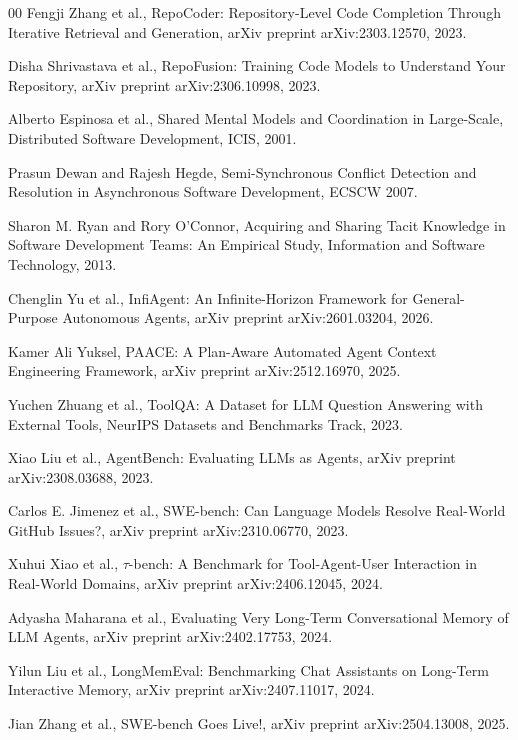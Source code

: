 \documentclass[a4paper,fleqn]{cas-dc}
\begin{document}
\begin{thebibliography}{00}
Fengji Zhang et al., RepoCoder: Repository-Level Code Completion Through Iterative Retrieval and Generation, arXiv preprint arXiv:2303.12570, 2023.

Disha Shrivastava et al., RepoFusion: Training Code Models to Understand Your Repository, arXiv preprint arXiv:2306.10998, 2023.

Alberto Espinosa et al., Shared Mental Models and Coordination in Large-Scale, Distributed Software Development, ICIS, 2001.

Prasun Dewan and Rajesh Hegde, Semi-Synchronous Conflict Detection and Resolution in Asynchronous Software Development, ECSCW 2007.

Sharon M. Ryan and Rory O'Connor, Acquiring and Sharing Tacit Knowledge in Software Development Teams: An Empirical Study, Information and Software Technology, 2013.

Chenglin Yu et al., InfiAgent: An Infinite-Horizon Framework for General-Purpose Autonomous Agents, arXiv preprint arXiv:2601.03204, 2026.

Kamer Ali Yuksel, PAACE: A Plan-Aware Automated Agent Context Engineering Framework, arXiv preprint arXiv:2512.16970, 2025.

Yuchen Zhuang et al., ToolQA: A Dataset for LLM Question Answering with External Tools, NeurIPS Datasets and Benchmarks Track, 2023.

Xiao Liu et al., AgentBench: Evaluating LLMs as Agents, arXiv preprint arXiv:2308.03688, 2023.

Carlos E. Jimenez et al., SWE-bench: Can Language Models Resolve Real-World GitHub Issues?, arXiv preprint arXiv:2310.06770, 2023.

Xuhui Xiao et al., $\tau$-bench: A Benchmark for Tool-Agent-User Interaction in Real-World Domains, arXiv preprint arXiv:2406.12045, 2024.

Adyasha Maharana et al., Evaluating Very Long-Term Conversational Memory of LLM Agents, arXiv preprint arXiv:2402.17753, 2024.

Yilun Liu et al., LongMemEval: Benchmarking Chat Assistants on Long-Term Interactive Memory, arXiv preprint arXiv:2407.11017, 2024.

Jian Zhang et al., SWE-bench Goes Live!, arXiv preprint arXiv:2504.13008, 2025.

\end{thebibliography}
\end{document}
